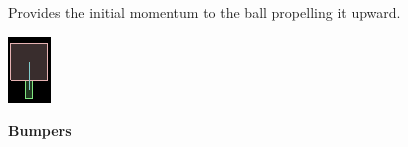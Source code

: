 \documentclass{article}
\begin{document}
    \begin{minipage}[t]{0.6\textwidth}
        \vspace{0pt}
        Provides the initial momentum to the ball propelling it upward.
    \end{minipage}
    \begin{minipage}[t]{0.25\textwidth}
        \vspace{0pt}
        \centering
        \includegraphics[width=0.9\linewidth,natwidth=610,natheight=642]{launcher.png} 
        \label{fig:launcher}
    \end{minipage}

    \textbf{Bumpers}
\end{document}

